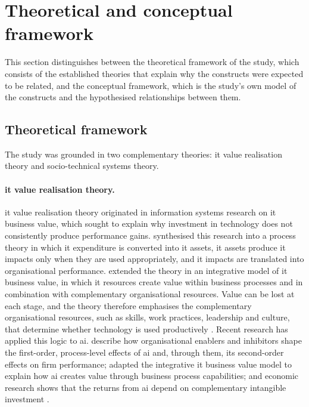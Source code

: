 
\section{Theoretical and conceptual framework}
\label{sec:ch1-framework}

This section distinguishes between the theoretical framework of the study, which consists of the established theories that explain why the constructs were expected to be related, and the conceptual framework, which is the study's own model of the constructs and the hypothesised relationships between them.

\subsection{Theoretical framework}
\label{subsec:ch1-theoretical}

The study was grounded in two complementary theories: \gls{it} value realisation theory and socio-technical systems theory.

\paragraph{\gls{it} value realisation theory.} \gls{it} value realisation theory originated in information systems research on \gls{it} business value, which sought to explain why investment in technology does not consistently produce performance gains. \textcite{Soh1995} synthesised this research into a process theory in which \gls{it} expenditure is converted into \gls{it} assets, \gls{it} assets produce \gls{it} impacts only when they are used appropriately, and \gls{it} impacts are translated into organisational performance. \textcite{Melville2004} extended the theory in an integrative model of \gls{it} business value, in which \gls{it} resources create value within business processes and in combination with complementary organisational resources. Value can be lost at each stage, and the theory therefore emphasises the complementary organisational resources, such as skills, work practices, leadership and culture, that determine whether technology is used productively \parencite{Mikalef2021, Enholm2022}. Recent research has applied this logic to \gls{ai}. \textcite{Enholm2022} describe how organisational enablers and inhibitors shape the first-order, process-level effects of \gls{ai} and, through them, its second-order effects on firm performance; \textcite{Zebec2024} adapted the integrative \gls{it} business value model to explain how \gls{ai} creates value through business process capabilities; and economic research shows that the returns from \gls{ai} depend on complementary intangible investment \parencite{Brynjolfsson2021}.


